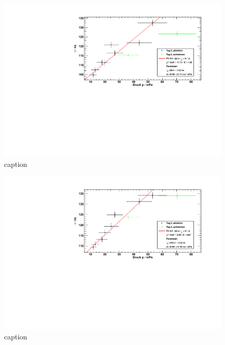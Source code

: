 \begin{figure}[H]
\begin{center}
  \includegraphics[width=\textwidth]{../img/taus_45_day2.pdf}
  \caption{caption}
  \label{img:taus:day2:45}
\end{center}
\end{figure}

\begin{figure}[H]
\begin{center}
  \includegraphics[width=\textwidth]{../img/taus_90_day2.pdf}
  \caption{caption}
  \label{img:taus:day2:90}
\end{center}
\end{figure}


